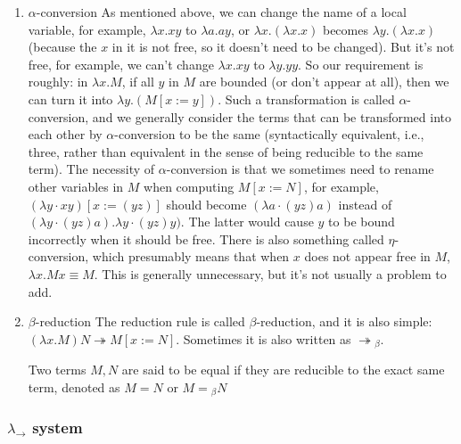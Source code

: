 \documentclass[a4paper]{exam}
\begin{document}
\begin{enumerate}
  \item $\alpha$-conversion
        As mentioned above, we can change the name of a local variable, for example, $\lambda x . x y$ to $\lambda a . a y$, or $\lambda x . (\lambda x . x)$ becomes $\lambda y . (\lambda x . x)$ (because the $x$ in it is not free, so it doesn't need to be changed). But it's not free, for example, we can't change $\lambda x . x y$ to $\lambda y . y y$.
        So our requirement is roughly: in $\lambda x . M$, if all $y$ in $M$ are bounded (or don't appear at all), then we can turn it into $\lambda y . (M[x:=y])$. Such a transformation is called $\alpha$-conversion, and we generally consider the terms that can be transformed into each other by $\alpha$-conversion to be the same (syntactically equivalent, i.e., three, rather than equivalent in the sense of being reducible to the same term).
        The necessity of $\alpha$-conversion is that we sometimes need to rename other variables in $M$ when computing $M[x:=N]$, for example, $(\lambda y \cdot x y)[x:=(y z)]$ should become $(\lambda a \cdot(y z) a)$ instead of $(\lambda y \cdot(y z) a). \lambda y \cdot(y z) y)$. The latter would cause $y$ to be bound incorrectly when it should be free.
        There is also something called $\eta$-conversion, which presumably means that when $x$ does not appear free in $M$, $\lambda x . M x \equiv M$. This is generally unnecessary, but it's not usually a problem to add.
  \item $\beta$-reduction
        The reduction rule is called $\beta$-reduction, and it is also simple: $(\lambda x . M) N \twoheadrightarrow M[x:=N]$. Sometimes it is also written as $\twoheadrightarrow{ } _ {\beta}$.

        Two terms $M, N$ are said to be equal if they are reducible to the exact same term, denoted as $M=N$ or $M={ } _ {\beta} N$
\end{enumerate}

\subsubsection{$\lambda_\to$ system \cite{barendregt1992lambda}}
\end{document}
